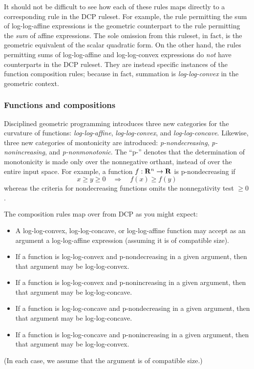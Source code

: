 \documentclass[12pt]{article}
\begin{document}
It should not be difficult to see how each of these rules maps directly to a corresponding
rule in the DCP ruleset. For example, the rule permitting the sum of log-log-affine expressions
is the geometric counterpart to the rule permitting the \emph{sum} of affine expressions.
The sole omission from this ruleset, in fact, is the geometric equivalent of the scalar
quadratic form. On the other hand, the rules permitting sums of log-log-affine and
log-log-convex expressions do \emph{not} have counterparts in the DCP ruleset. They are
instead specific instances of the function composition rules; because in fact, 
summation is \emph{log-log-convex} in the geometric context.

\subsubsection{Functions and compositions}
\label{sec:gp-functions}

Disciplined geometric programming introduces three new categories 
for the curvature of functions: \emph{log-log-affine},
\emph{log-log-convex}, and \emph{log-log-concave}. Likewise,
three new categories of montonicity are introduced: \emph{p-nondecreasing},
\emph{p-nonincreasing}, and \emph{p-nonmonotonic}. The ``p-'' denotes
that the determination of monotonicity is made only over the nonnegative
orthant, instead of over the entire input space.
For example, a function $f:\Rn\rightarrow\R$ is p-nondecreasing if
\begin{equation}
	x \geq y \geq 0 \quad\Longrightarrow\quad f(x) \geq f(y)
\end{equation}
whereas the criteria for nondecreasing functions omits the nonnegativity test $\geq 0$.

The composition rules map over from DCP as you might expect:
\begin{itemize}
\item A log-log-convex, log-log-concave, or log-log-affine function may accept as an argument
a log-log-affine expression (assuming it is of compatible size).
\item If a function is log-log-convex and p-nondecreasing in a given argument,
then that argument may be log-log-convex.
\item If a function is log-log-convex and p-nonincreasing in a given argument,
then that argument may be log-log-concave.
\item If a function is log-log-concave and p-nondecreasing in a given argument,
then that argument may be log-log-concave.
\item If a function is log-log-concave and p-nonincreasing in a given argument,
then that argument may be log-log-convex.
\end{itemize}
(In each case, we assume that the argument is of compatible size.)
\end{document}

